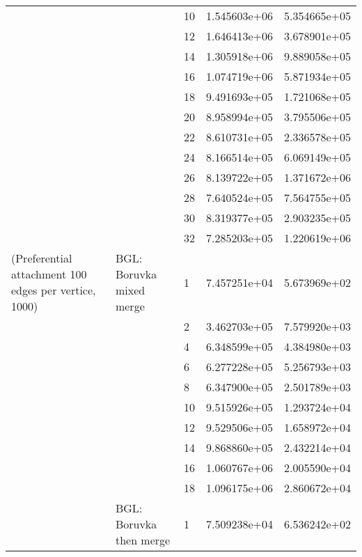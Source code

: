 \begin{tabular}{lllrr}
                      &            & 10 &  1.545603e+06 &  5.354665e+05 \\
                      &            & 12 &  1.646413e+06 &  3.678901e+05 \\
                      &            & 14 &  1.305918e+06 &  9.889058e+05 \\
                      &            & 16 &  1.074719e+06 &  5.871934e+05 \\
                      &            & 18 &  9.491693e+05 &  1.721068e+05 \\
                      &            & 20 &  8.958994e+05 &  3.795506e+05 \\
                      &            & 22 &  8.610731e+05 &  2.336578e+05 \\
                      &            & 24 &  8.166514e+05 &  6.069149e+05 \\
                      &            & 26 &  8.139722e+05 &  1.371672e+06 \\
                      &            & 28 &  7.640524e+05 &  7.564755e+05 \\
                      &            & 30 &  8.319377e+05 &  2.903235e+05 \\
                      &            & 32 &  7.285203e+05 &  1.220619e+06 \\
(Preferential attachment 100 edges per vertice, 1000) & BGL: Boruvka mixed merge & 1  &  7.457251e+04 &  5.673969e+02 \\
                      &            & 2  &  3.462703e+05 &  7.579920e+03 \\
                      &            & 4  &  6.348599e+05 &  4.384980e+03 \\
                      &            & 6  &  6.277228e+05 &  5.256793e+03 \\
                      &            & 8  &  6.347900e+05 &  2.501789e+03 \\
                      &            & 10 &  9.515926e+05 &  1.293724e+04 \\
                      &            & 12 &  9.529506e+05 &  1.658972e+04 \\
                      &            & 14 &  9.868860e+05 &  2.432214e+04 \\
                      &            & 16 &  1.060767e+06 &  2.005590e+04 \\
                      &            & 18 &  1.096175e+06 &  2.860672e+04 \\
                      & BGL: Boruvka then merge & 1  &  7.509238e+04 &  6.536242e+02 \\

\end{tabular}
